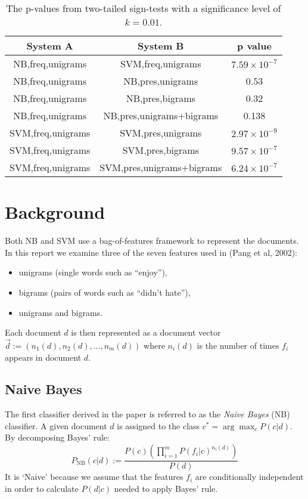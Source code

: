 \documentclass[12pt]{article}
\begin{document}
\begin{multicols}{2}
\begin{table*}[t]
\centering
 \begin{tabular}{|c|c||c|} 
 \hline
  System A & System B & p value\\ [0.5ex] 
 \hline\hline
NB,freq,unigrams & SVM,freq,unigrams & $7.59\times 10^{-7}$\\
 \hline
NB,freq,unigrams & NB,pres,unigrams & 0.53\\
 \hline
NB,freq,unigrams & NB,pres,bigrams & 0.32\\
 \hline
NB,freq,unigrams & NB,pres,unigrams+bigrams & 0.138 \\
 \hline
SVM,freq,unigrams & SVM,pres,unigrams & $2.97\times 10^{-9}$ \\
 \hline
SVM,freq,unigrams & SVM,pres,bigrams & $9.57\times 10^{-7}$ \\
 \hline
 SVM,freq,unigrams & SVM,pres,unigrams+bigrams & $6.24\times 10^{-7}$ \\
 \hline
\end{tabular}
\caption{The p-values from two-tailed sign-tests with a significance level of $k = 0.01$.} \label{table:p-values}
\end{table*}

\section{Background}

Both NB and SVM use a bag-of-features framework to represent the documents. In this report we examine three of the seven features used in (Pang et al, 2002):
\begin{itemize}
	\item unigrams (single words such as ``enjoy''),
	\item bigrams (pairs of words such as ``didn't hate''),
	\item unigrams and bigrams.
\end{itemize}

Each document $d$ is then represented as a document vector $\vec{d} := (n_{1}(d), n_{2}(d),\ldots,n_{m}(d))$ where $n_{i}(d)$ is the number of times $f_{i}$ appears in document $d$.

\subsection{Naive Bayes}

The first classifier derived in the paper is referred to as the \emph{Naive Bayes} (NB) classifier. A given document $d$ is assigned to the class $c^{*} = \arg \max_{c}P(c | d)$. By decomposing Bayes' rule:
\[P_\mathrm{NB}(c | d) := \frac{P(c)(\prod^{m}_{i=1}P(f_{i} | c)^{n_{i}(d)})}{P(d)} \]
It is `Naive' because we assume that the features $f_{i}$ are conditionally independent in order to calculate $P(d|c)$ needed to apply Bayes' rule.


\end{multicols}
\end{document}
